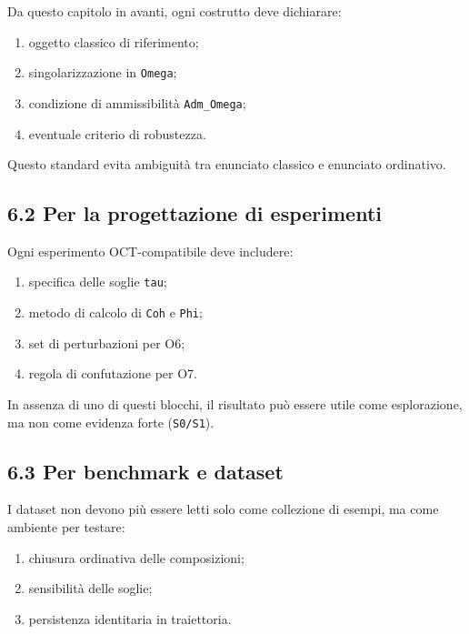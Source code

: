 Da questo capitolo in avanti, ogni costrutto deve dichiarare:

\begin{enumerate}
\def\labelenumi{\arabic{enumi}.}
\tightlist
\item
  oggetto classico di riferimento;
\item
  singolarizzazione in \texttt{Omega};
\item
  condizione di ammissibilità \texttt{Adm\_Omega};
\item
  eventuale criterio di robustezza.
\end{enumerate}

Questo standard evita ambiguità tra enunciato classico e enunciato ordinativo.

\subsection{6.2 Per la progettazione di esperimenti}

Ogni esperimento OCT-compatibile deve includere:

\begin{enumerate}
\def\labelenumi{\arabic{enumi}.}
\tightlist
\item
  specifica delle soglie \texttt{tau};
\item
  metodo di calcolo di \texttt{Coh} e \texttt{Phi};
\item
  set di perturbazioni per O6;
\item
  regola di confutazione per O7.
\end{enumerate}

In assenza di uno di questi blocchi, il risultato può essere utile come esplorazione, ma non come evidenza forte (\texttt{S0/S1}).

\subsection{6.3 Per benchmark e dataset}

I dataset non devono più essere letti solo come collezione di esempi, ma come ambiente per testare:

\begin{enumerate}
\def\labelenumi{\arabic{enumi}.}
\tightlist
\item
  chiusura ordinativa delle composizioni;
\item
  sensibilità delle soglie;
\item
  persistenza identitaria in traiettoria.
\end{enumerate}

